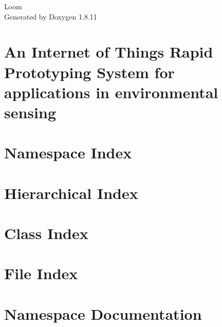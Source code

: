 \documentclass[twoside]{book}
\newcommand{\+}{\discretionary{\mbox{\scriptsize$\hookleftarrow$}}{}{}}
\newcommand{\clearemptydoublepage}{%
  \newpage{\pagestyle{empty}\cleardoublepage}%
}
\begin{document}
\hypersetup{pageanchor=false,
             bookmarksnumbered=true,
             pdfencoding=unicode
            }
\begin{titlepage}
\vspace*{7cm}
\begin{center}%
{\Large Loom }\\
\vspace*{1cm}
{\large Generated by Doxygen 1.8.11}\\
\end{center}
\end{titlepage}
\clearemptydoublepage
\tableofcontents
\clearemptydoublepage
{}
\hypersetup{pageanchor=true}

\chapter{An Internet of Things Rapid Prototyping System for applications in environmental sensing}
\label{index}\hypertarget{index}{}
\chapter{Namespace Index}

\chapter{Hierarchical Index}

\chapter{Class Index}

\chapter{File Index}

\chapter{Namespace Documentation}



\end{document}
